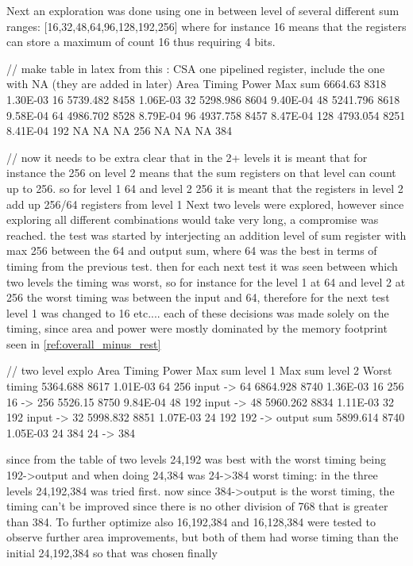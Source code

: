 \documentclass[conference]{IEEEtran}
\begin{document}
Next an exploration was done using one in between level of several different sum ranges: [16,32,48,64,96,128,192,256] where for instance 16 means that the registers can store a maximum of count 16 thus requiring 4 bits.

// make table in latex from this : CSA one pipelined register, include the one with NA (they are added in later)
Area	Timing	Power		Max sum
6664.63	8318	1.30E-03		16
5739.482	8458	1.06E-03		32
5298.986	8604	9.40E-04		48
5241.796	8618	9.58E-04		64
4986.702	8528	8.79E-04		96
4937.758	8457	8.47E-04		128
4793.054	8251	8.41E-04		192
NA	NA	NA		256
NA	NA	NA		384


// now it needs to be extra clear that in the 2+ levels it is meant that for instance the 256 on level 2 means that the sum registers on that level can count up to 256. so for level 1 64 and level 2 256 it is meant that the registers in level 2 add up 256/64 registers from level 1
Next two levels were explored, however since exploring all different combinations would take very long, a compromise was reached.
the test was started by interjecting an addition level of sum register with max 256 between the 64 and output sum, where 64 was the best in terms of timing from the previous test.
then for each next test it was seen between which two levels the timing was worst, so for instance for the level 1 at 64 and level 2 at 256 the worst timing was between the input and 64, therefore for the next
test level 1 was changed to 16 etc....
each of these decisions was made solely on the timing, since area and power were mostly dominated by the memory footprint seen in \ref{ref:overall_minus_rest}

// two level explo
Area	Timing	Power	Max sum level 1	Max sum level 2	Worst timing
5364.688	8617	1.01E-03	64	256	input -> 64
6864.928	8740	1.36E-03	16	256	16 -> 256
5526.15	8750	9.84E-04	48	192	input -> 48
5960.262	8834	1.11E-03	32	192	input -> 32
5998.832	8851	1.07E-03	24	192	192 -> output sum
5899.614	8740	1.05E-03	24	384	24 -> 384


since from the table of two levels 24,192 was best with the worst timing being 192->output and when doing 24,384 was 24->384 worst timing: in the three levels 24,192,384 was tried first.
now since 384->output is the worst timing, the timing can't be improved since there is no other division of 768 that is greater than 384.
To further optimize also 16,192,384 and 16,128,384 were tested to observe further area improvements, but both of them had worse timing than the initial 24,192,384 so that was chosen finally
\end{document}
